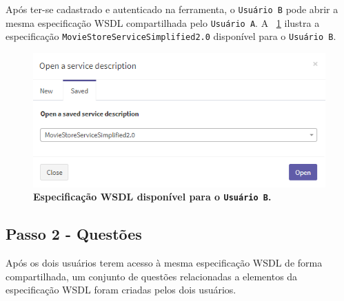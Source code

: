 Após ter-se cadastrado e autenticado na ferramenta, o \texttt{Usuário B} pode abrir a mesma especificação WSDL compartilhada pelo \texttt{Usuário A}. A \figurename~\ref{fig:estudo-de-caso-wsdl-compartilhado-disponivel-para-usuario} ilustra a especificação \texttt{MovieStoreServiceSimplified2.0} disponível para o \texttt{Usuário B}.

    \begin{figure}[h]
            \includegraphics[scale=1.5]{5-grasews-estudo-de-caso/imagens/estudo-de-caso-wsdl-compartilhado-disponivel-para-usuario.png}
        \centering
        \caption[Especificação WSDL disponível para o \texttt{Usuário B}]{\textbf{Especificação WSDL disponível para o \texttt{Usuário B}.}}
        \label{fig:estudo-de-caso-wsdl-compartilhado-disponivel-para-usuario}
    \end{figure}

\subsection{Passo 2 - Questões}\label{estudo-de-caso-passo2-questoes}

Após os dois usuários terem acesso à mesma especificação WSDL de forma compartilhada, um conjunto de questões relacionadas a elementos da especificação WSDL foram criadas pelos dois usuários.



